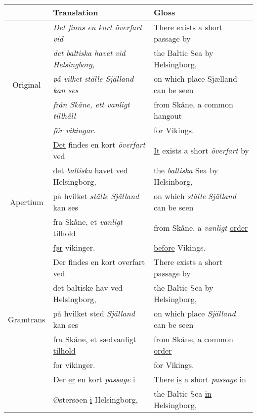 \documentclass[11pt]{article}
\begin{document}
\begin{table*}
 \begin{tabular}{|c|l|l|}
\hline
           & Translation                                & Gloss \\
\hline
~          & \emph{Det finns en kort överfart vid}      & There exists a short passage by \\
~          & \emph{det baltiska havet vid Helsingborg,} & the Baltic Sea by Helsingborg, \\
Original   & \emph{på vilket ställe Själland kan ses }  & on which place Sjælland can be seen \\ 
~          & \emph{från Skåne, ett vanligt tillhåll }   & from Skåne, a common hangout \\ 
~          & \emph{för vikingar.}                       & for Vikings.\\
\hline
~          & \underline{Det} findes en kort \emph{överfart} ved    & \underline{It} exists a short \emph{överfart} by \\
~          & det \emph{baltiska} havet ved Helsingborg,            & the \emph{baltiska} Sea by Helsinborg, \\
Apertium   & på hvilket \emph{ställe} \emph{Själland} kan ses      & on which \emph{ställe} \emph{Själland} can be seen \\
~          & fra Skåne, et \emph{vanligt} \underline{tilhold}      & from Skåne, a \emph{vanligt} \underline{order} \\
~          & \underline{før} vikinger.                             & \underline{before} Vikings.\\
\hline
~          & Der findes en kort overfart ved                  & There exists a short passage by \\
~          & det baltiske hav ved Helsingborg,                & the Baltic Sea by Helsingborg, \\
Gramtrans  & på hvilket sted \emph{Själland} kan ses          & on which place \emph{Själland} can be seen \\ 
~          & fra Skåne, et sædvanligt \underline{tilhold}     & from Skåne, a common \underline{order} \\
~          & for vikinger.                                    & for Vikings. \\
\hline
~          & Der \underline{er} en kort \emph{passage} i      & There \underline{is} a short \emph{passage} in \\
~          & Østersøen \underline{i} Helsingborg,             & the Baltic Sea \underline{in} Helsingborg, \\

\end{tabular}
\end{table*}
\end{document}
